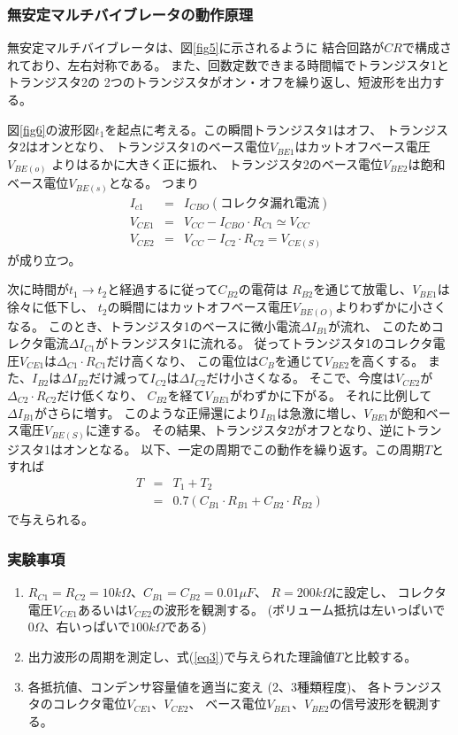 \documentclass[12pt]{jarticle}
\begin{document}
\subsubsection*{無安定マルチバイブレータの動作原理}
無安定マルチバイブレータは、図\ref{fig5}に示されるように
結合回路が$CR$で構成されており、左右対称である。
また、回数定数できまる時間幅でトランジスタ1とトランジスタ2の
2つのトランジスタがオン・オフを繰り返し、短波形を出力する。

図\ref{fig6}の波形図$t_1$を起点に考える。この瞬間トランジスタ1はオフ、
トランジスタ2はオンとなり、
トランジスタ1のベース電位$V_{BE1}$はカットオフベース電圧$V_{BE(o)}$
よりはるかに大きく正に振れ、
トランジスタ2のベース電位$V_{BE2}$は飽和ベース電位$V_{BE(s)}$となる。
つまり
\begin{eqnarray}
    I_{c1} &=& I_{CBO}　(コレクタ漏れ電流)\nonumber\\
    V_{CE1} &=& V_{CC} - I_{CBO} \cdot R_{C1} \simeq V_{CC}\nonumber\\
    V_{CE2} &=& V_{CC} - I_{C2} \cdot R_{C2} = V_{CE(S)}
\end{eqnarray}
が成り立つ。

次に時間が$t_1 \rightarrow t_2$と経過するに従って$C_{B2}$の電荷は
$R_{B2}$を通じて放電し、$V_{BE1}$は徐々に低下し、
$t_2$の瞬間にはカットオフベース電圧$V_{BE(O)}$よりわずかに小さくなる。
このとき、トランジスタ1のベースに微小電流$\Delta I_{B1}$が流れ、
このためコレクタ電流$\Delta I_{C1}$がトランジスタ1に流れる。
従ってトランジスタ1のコレクタ電圧$V_{CE1}$は$\Delta_{C1}\cdot R_{C1}$だけ高くなり、
この電位は$C_B$を通じて$V_{BE2}$を高くする。
また、$I_{B2}$は$\Delta I_{B2}$だけ減って$I_{C2}$は$\Delta I_{C2}$だけ小さくなる。
そこで、今度は$V_{CE2}$が$\Delta_{C2}\cdot R_{C2}$だけ低くなり、
$C_{B2}$を経て$V_{BE1}$がわずかに下がる。
それに比例して$\Delta I_{B1}$がさらに増す。
このような正帰還により$I_{B1}$は急激に増し、$V_{BE1}$が飽和ベース電圧$V_{BE(S)}$に達する。
その結果、トランジスタ2がオフとなり、逆にトランジスタ1はオンとなる。
以下、一定の周期でこの動作を繰り返す。この周期$T$とすれば
\begin{eqnarray}
    T &=& T_1 + T_2\nonumber\\
    &=& 0.7(C_{B1} \cdot R_{B1} + C_{B2} \cdot R_{B2}) \label{eq3}
\end{eqnarray}
で与えられる。

\subsubsection*{実験事項}
\begin{enumerate}
    \item $R_{C1} = R_{C2} = 10k\Omega$、$C_{B1} = C_{B2}= 0.01 \mu F$、
          $R = 200k\Omega$に設定し、
          コレクタ電圧$V_{CE1}$あるいは$V_{CE2}$の波形を観測する。
          (ボリューム抵抗は左いっぱいで$0\Omega$、右いっぱいで$100k\Omega$である)
    \item 出力波形の周期を測定し、式(\ref{eq3})で与えられた理論値$T$と比較する。
    \item 各抵抗値、コンデンサ容量値を適当に変え (2、3種類程度)、
          各トランジスタのコレクタ電位$V_{CE1}$、$V_{CE2}$、
          ベース電位$V_{BE1}$、$V_{BE2}$の信号波形を観測する。
\end{enumerate}
\end{document}
